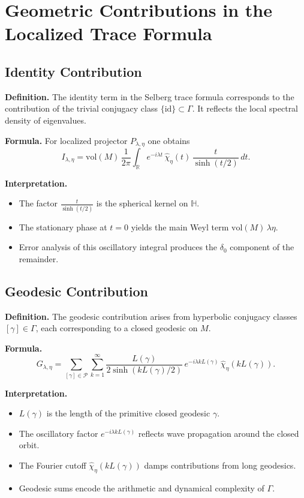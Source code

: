 
\section{Geometric Contributions in the Localized Trace Formula}

\subsection{Identity Contribution}

\noindent\textbf{Definition.}
The identity term in the Selberg trace formula corresponds to the contribution of the trivial conjugacy class $\{\mathrm{id}\}\subset\Gamma$.  
It reflects the local spectral density of eigenvalues.

\medskip

\noindent\textbf{Formula.}
For localized projector $P_{\lambda,\eta}$ one obtains
\[
  I_{\lambda,\eta}
  = \mathrm{vol}(M)\,\frac{1}{2\pi}\int_{\mathbb{R}}
    e^{-i\lambda t}\, \widehat{\chi}_\eta(t)\,\frac{t}{\sinh(t/2)}\, dt.
\]

\noindent\textbf{Interpretation.}
\begin{itemize}
  \item The factor $\tfrac{t}{\sinh(t/2)}$ is the spherical kernel on $\mathbb{H}$.
  \item The stationary phase at $t=0$ yields the main Weyl term $\mathrm{vol}(M)\,\lambda\eta$.
  \item Error analysis of this oscillatory integral produces the $\delta_0$ component of the remainder.
\end{itemize}

\subsection{Geodesic Contribution}

\noindent\textbf{Definition.}
The geodesic contribution arises from hyperbolic conjugacy classes $[\gamma]\in\Gamma$, each corresponding to a closed geodesic on $M$.

\medskip

\noindent\textbf{Formula.}
\[
  G_{\lambda,\eta}
  = \sum_{[\gamma]\in\mathcal{P}}\sum_{k=1}^\infty
    \frac{L(\gamma)}{2\sinh(k L(\gamma)/2)}\,
    e^{-i\lambda k L(\gamma)}\, \widehat{\chi}_\eta(k L(\gamma)).
\]

\noindent\textbf{Interpretation.}
\begin{itemize}
  \item $L(\gamma)$ is the length of the primitive closed geodesic $\gamma$.
  \item The oscillatory factor $e^{-i\lambda k L(\gamma)}$ reflects wave propagation around the closed orbit.
  \item The Fourier cutoff $\widehat{\chi}_\eta(k L(\gamma))$ damps contributions from long geodesics.
  \item Geodesic sums encode the arithmetic and dynamical complexity of $\Gamma$.
\end{itemize}

